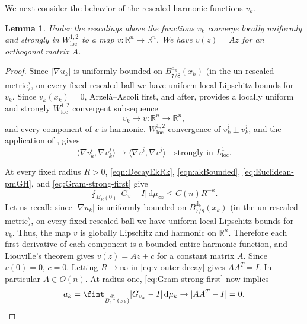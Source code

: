 \documentclass[12pt,a4paper,reqno]{amsart}
\newtheorem{lemma}[theorem]{Lemma}
\renewcommand{\leq}{\leqslant}
\newcommand{\R}{\mathbb R}
\newcommand{\loc}{\mathrm{loc}}
\begin{document}
We next consider the behavior of the rescaled harmonic functions $v_k$. 
\begin{lemma}
    Under the rescalings above the functions $v_k$ converge locally uniformly and strongly in $W^{1,2}_{\mathrm{loc}}$ to a map $v:\mathbb{R}^n \to \mathbb{R}^n$. We have $v(z) = Az$ for an orthogonal matrix $A$. 
\end{lemma}
\begin{proof}
Since $|\nabla u_k|$ is uniformly bounded on $B_{7/8}^{\mathrm{d}_k}(x_k)$ (in the un-rescaled metric), on every fixed rescaled ball we have uniform local
Lipschitz bounds for $v_k$.  Since $v_k(x_k)=0$, Arzelà--Ascoli first, and \cite[Theorem 4.4]{AmbrosioHondaSpectral} after,
provides a locally uniform and strongly $W^{1,2}_{\loc}$ convergent
subsequence
\begin{equation}\label{eq:v-limit}
 v_k\to v:\R^n\longrightarrow\R^n,
\end{equation}
and every component of $v$ is harmonic.  $W^{1,2}_{\mathrm{loc}}$-convergence of $v_k^{i}\pm v_k^j$, and the application of \cite[Theorem 4.4(3)]{AmbrosioHondaSpectral}, gives
\begin{equation}\label{eq:Gram-strong-first}
 \langle\nabla v_k^i,\nabla v_k^j\rangle
 \to
 \langle\nabla v^i,\nabla v^j\rangle
 \quad\text{strongly in }L^1_{\loc}.
\end{equation}

At every fixed
radius $R>0$, \eqref{eqn:DecayEkRk}, \eqref{eqn:akBounded},
\eqref{eq:Euclidean-pmGH}, and \eqref{eq:Gram-strong-first} give
\begin{equation}\label{eq:v-outer-decay}
 \fint_{B_R(0)}|G_v-I|\,\mathrm{d}\mu_\infty
 \leq C(n) R^{-\kappa}.
\end{equation}
Let us recall: since $|\nabla u_k|$ is uniformly bounded on $B_{7/8}^{\mathrm{d}_k}(x_k)$ (in the un-rescaled metric), on every fixed rescaled ball we have uniform local
Lipschitz bounds for $v_k$. Thus, the map $v$ is globally Lipschitz and harmonic on $\mathbb R^n$.
Therefore each first derivative of each component is a bounded entire
harmonic function, and Liouville's theorem gives $v(z)=Az+c$ for a
constant matrix $A$.  Since $v(0)=0$, $c=0$.  Letting $R\to\infty$ in
\eqref{eq:v-outer-decay} gives $AA^T=I$.  In particular $A\in O(n)$.
At radius one, \eqref{eq:Gram-strong-first} now implies
\begin{equation}\label{eq:a-to-zero}
 a_k=\fint_{B_1^{\mathrm{d}'_k}(x_k)}|G_{v_k}-I|\,\mathrm{d}\mu_k
 \to |AA^T-I|=0. \qedhere
\end{equation}
\end{proof}
\end{document}
